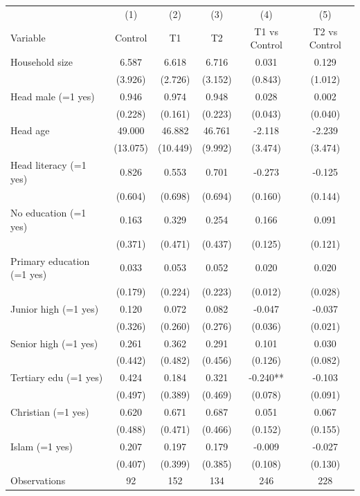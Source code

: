 \begin{tabular}{l*{5}c}
\hline\hline
 & (1) & (2) & (3) & (4) & (5) \\
Variable & Control & T1 & T2 & T1 vs Control & T2 vs Control \\
\hline
Household size&6.587&6.618&6.716&0.031&0.129\\
&(3.926)&(2.726)&(3.152)&(0.843)&(1.012)\\
Head male (=1 yes)&0.946&0.974&0.948&0.028&0.002\\
&(0.228)&(0.161)&(0.223)&(0.043)&(0.040)\\
Head age&49.000&46.882&46.761&-2.118&-2.239\\
&(13.075)&(10.449)&(9.992)&(3.474)&(3.474)\\
Head literacy (=1 yes)&0.826&0.553&0.701&-0.273&-0.125\\
&(0.604)&(0.698)&(0.694)&(0.160)&(0.144)\\
No education  (=1 yes)&0.163&0.329&0.254&0.166&0.091\\
&(0.371)&(0.471)&(0.437)&(0.125)&(0.121)\\
Primary education  (=1 yes)&0.033&0.053&0.052&0.020&0.020\\
&(0.179)&(0.224)&(0.223)&(0.012)&(0.028)\\
Junior high  (=1 yes)&0.120&0.072&0.082&-0.047&-0.037\\
&(0.326)&(0.260)&(0.276)&(0.036)&(0.021)\\
Senior high  (=1 yes)&0.261&0.362&0.291&0.101&0.030\\
&(0.442)&(0.482)&(0.456)&(0.126)&(0.082)\\
Tertiary edu  (=1 yes)&0.424&0.184&0.321&-0.240**&-0.103\\
&(0.497)&(0.389)&(0.469)&(0.078)&(0.091)\\
Christian (=1 yes)&0.620&0.671&0.687&0.051&0.067\\
&(0.488)&(0.471)&(0.466)&(0.152)&(0.155)\\
Islam (=1 yes)&0.207&0.197&0.179&-0.009&-0.027\\
&(0.407)&(0.399)&(0.385)&(0.108)&(0.130)\\
\hline
Observations & 92 & 152 & 134 & 246 & 228 \\
\hline\hline
\end{tabular}
